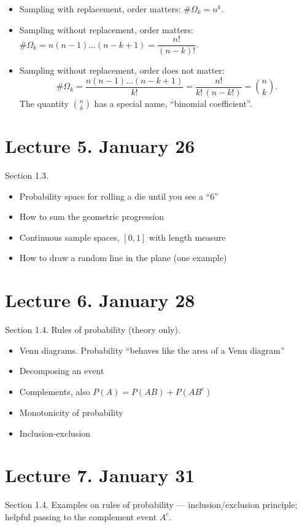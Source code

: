 \documentclass[letterpaper,11pt,oneside,reqno]{amsart}
\numberwithin{equation}{section}
\theoremstyle{definition}
\begin{document}
\begin{itemize}
	\item Sampling with replacement, order matters: $\# \Omega_k=n^k$.
	\item Sampling without replacement, order matters: $\# \Omega_k=n(n-1)\ldots (n-k+1)=\dfrac{n!}{(n-k)!}$.
	\item Sampling without replacement, order does not matter:
		$$\# \Omega_k=\dfrac{n(n-1)\ldots(n-k+1) }{k!}
		=\dfrac{n!}{k!\, (n-k!)}=\binom nk .$$
		The quantity $\binom nk$ has a special name, ``binomial coefficient''.
\end{itemize}

\section*{Lecture 5. January 26}

Section 1.3.
\begin{itemize}
	\item Probability space for rolling a die until you see a ``6''
	\item How to sum the geometric progression
	\item Continuous sample spaces, $[0,1]$ with length measure
	\item How to draw a random line in the plane (one example)
\end{itemize}

\section*{Lecture 6. January 28}

Section 1.4. Rules of probability (theory only).
\begin{itemize}
	\item Venn diagrams. Probability ``behaves like the area of a Venn diagram''
	\item Decomposing an event
	\item Complements, also $P(A)=P(AB)+P(AB^c)$
	\item Monotonicity of probability
	\item Inclusion-exclusion
\end{itemize}

\section*{Lecture 7. January 31}
Section 1.4. Examples on rules of probability --- inclusion/exclusion principle; helpful passing to 
the complement event
$A^c$.
\end{document}
